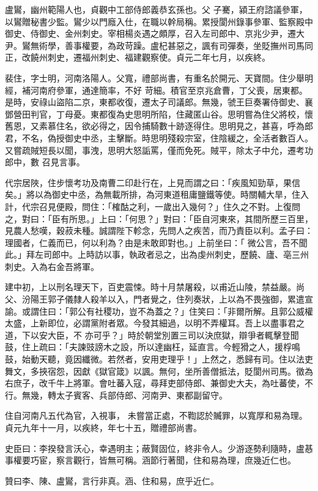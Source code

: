 \begin{pinyinscope}
 盧鸑，幽州範陽人也，貞觀中工部侍郎義恭玄孫也。父
 子騫，潁王府諮議參軍，以鸑贈秘書少監。鸑少以門廕入仕，在職以幹局稱。累授閬州錄事參軍、監察殿中御史、侍御史、金州刺史。宰相楊炎遇之頗厚，召入左司郎中、京兆少尹，遷大尹。鸑無術學，善事權要，為政苛躁。盧杞甚惡之，諷有司彈奏，坐貶撫州司馬同正，改饒州刺史，遷福州刺史、福建觀察使。貞元二年七月，以疾終。



 裴住，字士明，河南洛陽人。父寬，禮部尚書，有重名於開元、天寶間。住少舉明經，補河南府參軍，通達簡率，不好
 苛細。積官至京兆倉曹，丁父喪，居東都。是時，安祿山盜陷二京，東都收復，遷太子司議郎。無幾，虢王巨奏署侍御史、襄鄧營田判官，丁母憂。東都復為史思明所陷，住藏匿山谷。思明嘗為住父將校，懷舊恩，又素慕住名，欲必得之，因令捕騎數十跡逐得住。思明見之，甚喜，呼為郎君，不名，偽授御史中丞，主擊斷。時思明殘殺宗室，住陰緩之，全活者數百人。又嘗疏賊短長以聞，事洩，思明大怒詬罵，僅而免死。賊平，除太子中允，遷考功郎中，數
 召見言事。



 代宗居陜，住步懷考功及南曹二印赴行在，上見而謂之曰：「疾風知勁草，果信矣。」將以為御史中丞，為無載所排，為河東道租庸鹽鐵等使。時關輔大旱，住入計，代宗召見便殿，問住：「榷酤之利，一歲出入幾何？」住久之不對。上復問之，對曰：「臣有所思。」上曰：「何思？」對曰：「臣自河東來，其間所歷三百里，見農人愁嘆，穀菽未種。誠謂陛下軫念，先問人之疾苦，而乃責臣以利。孟子曰：理國者，仁義而已，何以利為？由是未敢即對也。」上前坐曰：「
 微公言，吾不聞此。」拜左司郎中。上時訪以事，執政者忌之，出為虔州刺史，歷饒、廬、亳三州刺史。入為右金吾將軍。



 建中初，上以刑名理天下，百吏震悚。時十月禁屠殺，以甫近山陵，禁益嚴。尚父、汾陽王郭子儀隸人殺羊以入，門者覺之，住列奏狀，上以為不畏強御，累遣宣諭。或謂住曰：「郭公有社稷功，豈不為蓋之？」住笑曰：「非爾所解。且郭公威權太盛，上新即位，必謂黨附者眾。今發其細過，以明不弄權耳。吾上以盡事君之道，下以安大臣，不
 亦可乎？」時於朝堂別置三司以決庶獄，辯爭者輒擊登聞鼓，住上疏曰：「夫諫豉謗木之設，所以達幽枉，延直言。今輕猾之人，援桴鳴鼓，始動天聽，竟因纖微。若然者，安用吏理乎！」上然之，悉歸有司。住以法吏舞文，多挾宿怨，因獻《獄官箴》以諷。無何，坐所善僧抵法，貶閬州司馬。徵為右庶子，改千牛上將軍。會吐蕃入寇，尋拜吏部侍郎、兼御史大夫，為吐蕃使，不行。無幾，轉太子賓客、兵部侍郎、河南尹、東都副留守。



 住自河南凡五代為官，入視事，
 未嘗當正處，不鞫認於贓罪，以寬厚和易為理。貞元九年十一月，以疾終，年七十五，贈禮部尚書。



 史臣曰：李揆發言沃心，幸遇明主；蔽賢固位，終非令人。少游逐勢利隨時，盧惎事權要巧宦，察言觀行，皆無可稱。涵節行著聞，住和易為理，庶幾近仁也。



 贊曰李、陳、盧鸑，言行非真。涵、住和易，庶乎近仁。



\end{pinyinscope}